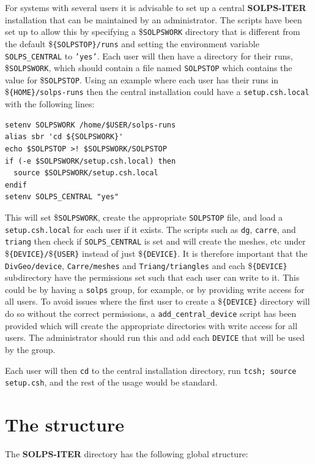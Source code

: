 \documentclass[a4paper,10pt]{report}
\newcommand\SOLPSITER{{\bf SOLPS-ITER} }
\begin{document}
For systems with several users it is advisable to set up a central \SOLPSITER installation that can be maintained by an administrator. The scripts have been set up to allow this by specifying a \${\tt SOLPSWORK} directory that is different from the default \${\tt \{SOLPSTOP\}/runs} and setting the environment variable {\tt SOLPS\_CENTRAL} to {\tt 'yes'}.  Each user will then have a directory for their runs, \${\tt SOLPSWORK}, which should contain a file named {\tt SOLPSTOP} which contains the value for \${\tt SOLPSTOP}. Using an example where each user has their runs in \${\tt \{HOME\}/solps-runs} then the central installation could have a {\tt setup.csh.local} with the following lines:
\begin{verbatim}
setenv SOLPSWORK /home/$USER/solps-runs
alias sbr 'cd ${SOLPSWORK}'
echo $SOLPSTOP >! $SOLPSWORK/SOLPSTOP
if (-e $SOLPSWORK/setup.csh.local) then
  source $SOLPSWORK/setup.csh.local
endif
setenv SOLPS_CENTRAL "yes"
\end{verbatim}
This will set \${\tt SOLPSWORK}, create the appropriate {\tt SOLPSTOP} file, and load a {\tt setup.csh.local} for each user if it exists. The scripts such as {\tt dg}, {\tt carre}, and {\tt triang} then check if {\tt SOLPS\_CENTRAL} is set and will create the meshes, etc under \${\tt \{DEVICE\}/}\${\tt \{USER\}} instead of just \${\tt \{DEVICE\}}. It is therefore important that the {\tt DivGeo/device}, {\tt Carre/meshes} and {\tt Triang/triangles} and each \${\tt \{DEVICE\}} subdirectory have the permissions set such that each user can write to it. This could be by having a {\tt solps} group, for example, or by providing write access for all users. To avoid issues where the first user to create a \${\tt \{DEVICE\}} directory will do so without the correct permissions, a {\tt add\_central\_device} script has been provided which will create the appropriate directories with write access for all users. The administrator should run this and add each {\tt DEVICE} that will be used by the group.

Each user will then {\tt cd} to the central installation directory, run {\tt tcsh; source setup.csh}, and the rest of the usage would be standard.

\chapter{The structure}
\label{cha:structure}

The \SOLPSITER directory has the following global structure:
\end{document}
